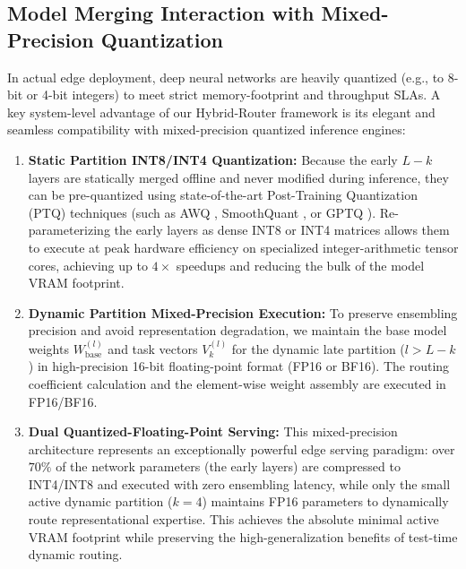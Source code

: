 \subsection{Model Merging Interaction with Mixed-Precision Quantization}
\label{sec:quantization}
In actual edge deployment, deep neural networks are heavily quantized (e.g., to 8-bit or 4-bit integers) to meet strict memory-footprint and throughput SLAs. A key system-level advantage of our Hybrid-Router framework is its elegant and seamless compatibility with mixed-precision quantized inference engines:
\begin{enumerate}
    \item \textbf{Static Partition INT8/INT4 Quantization:} Because the early $L-k$ layers are statically merged offline and never modified during inference, they can be pre-quantized using state-of-the-art Post-Training Quantization (PTQ) techniques (such as AWQ \cite{lin2023awq}, SmoothQuant \cite{xiao2023smoothquant}, or GPTQ \cite{frantar2022gptq}). Re-parameterizing the early layers as dense INT8 or INT4 matrices allows them to execute at peak hardware efficiency on specialized integer-arithmetic tensor cores, achieving up to $4\times$ speedups and reducing the bulk of the model VRAM footprint.
    \item \textbf{Dynamic Partition Mixed-Precision Execution:} To preserve ensembling precision and avoid representation degradation, we maintain the base model weights $W_{\text{base}}^{(l)}$ and task vectors $V_k^{(l)}$ for the dynamic late partition ($l > L-k$) in high-precision 16-bit floating-point format (FP16 or BF16). The routing coefficient calculation and the element-wise weight assembly are executed in FP16/BF16.
    \item \textbf{Dual Quantized-Floating-Point Serving:} This mixed-precision architecture represents an exceptionally powerful edge serving paradigm: over $70\%$ of the network parameters (the early layers) are compressed to INT4/INT8 and executed with zero ensembling latency, while only the small active dynamic partition ($k=4$) maintains FP16 parameters to dynamically route representational expertise. This achieves the absolute minimal active VRAM footprint while preserving the high-generalization benefits of test-time dynamic routing.
\end{enumerate}

